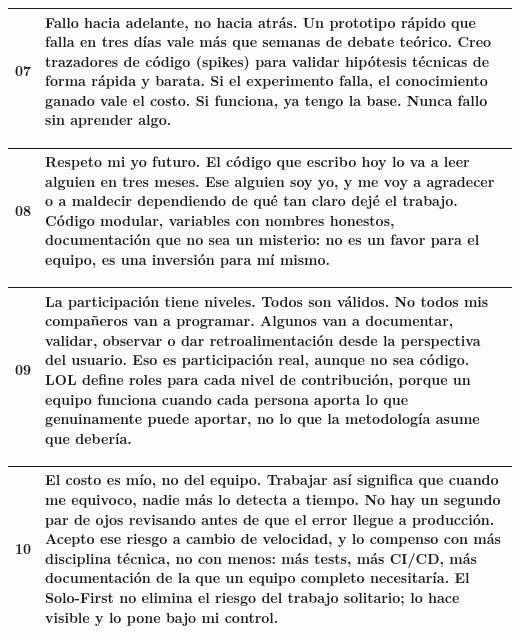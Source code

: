 \documentclass[14pt,a4paper,oneside]{extbook}
\begin{document}
\begin{table}[htbp]
\centering
\begin{tabular}{p{} p{}}
\toprule
\textbf{07} & \textbf{Fallo hacia adelante, no hacia atrás. Un prototipo rápido que falla en tres días vale más que semanas de debate teórico. Creo trazadores de código (spikes) para validar hipótesis técnicas de forma rápida y barata. Si el experimento falla, el conocimiento ganado vale el costo. Si funciona, ya tengo la base. Nunca fallo sin aprender algo.} \\
\midrule
\bottomrule
\end{tabular}
\end{table}



\begin{table}[htbp]
\centering
\begin{tabular}{p{} p{}}
\toprule
\textbf{08} & \textbf{Respeto mi yo futuro. El código que escribo hoy lo va a leer alguien en tres meses. Ese alguien soy yo, y me voy a agradecer o a maldecir dependiendo de qué tan claro dejé el trabajo. Código modular, variables con nombres honestos, documentación que no sea un misterio: no es un favor para el equipo, es una inversión para mí mismo.} \\
\midrule
\bottomrule
\end{tabular}
\end{table}



\begin{table}[htbp]
\centering
\begin{tabular}{p{} p{}}
\toprule
\textbf{09} & \textbf{La participación tiene niveles. Todos son válidos. No todos mis compañeros van a programar. Algunos van a documentar, validar, observar o dar retroalimentación desde la perspectiva del usuario. Eso es participación real, aunque no sea código. LOL define roles para cada nivel de contribución, porque un equipo funciona cuando cada persona aporta lo que genuinamente puede aportar, no lo que la metodología asume que debería.} \\
\midrule
\bottomrule
\end{tabular}
\end{table}



\begin{table}[htbp]
\centering
\begin{tabular}{p{} p{}}
\toprule
\textbf{10} & \textbf{El costo es mío, no del equipo. Trabajar así significa que cuando me equivoco, nadie más lo detecta a tiempo. No hay un segundo par de ojos revisando antes de que el error llegue a producción. Acepto ese riesgo a cambio de velocidad, y lo compenso con más disciplina técnica, no con menos: más tests, más CI/CD, más documentación de la que un equipo completo necesitaría. El Solo-First no elimina el riesgo del trabajo solitario; lo hace visible y lo pone bajo mi control.} \\
\midrule
\bottomrule
\end{tabular}
\end{table}
\end{document}
